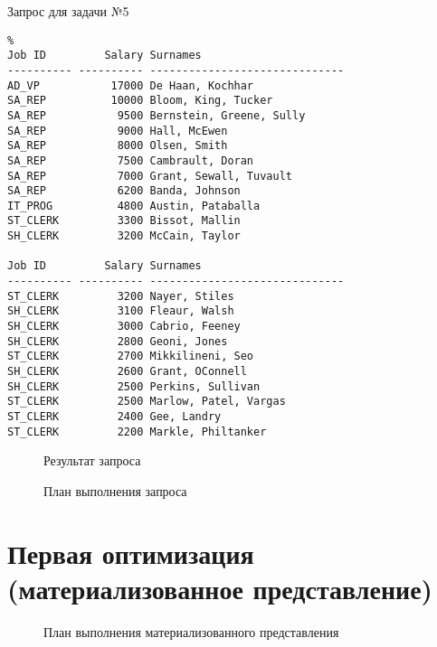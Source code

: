 
\begin{algorithm}[H]
  \caption{Запрос для задачи №5}
  \label{code-task-5}
\end{algorithm}

\begin{verbatim}%
Job ID         Salary Surnames
---------- ---------- ------------------------------
AD_VP           17000 De Haan, Kochhar
SA_REP          10000 Bloom, King, Tucker
SA_REP           9500 Bernstein, Greene, Sully
SA_REP           9000 Hall, McEwen
SA_REP           8000 Olsen, Smith
SA_REP           7500 Cambrault, Doran
SA_REP           7000 Grant, Sewall, Tuvault
SA_REP           6200 Banda, Johnson
IT_PROG          4800 Austin, Pataballa
ST_CLERK         3300 Bissot, Mallin
SH_CLERK         3200 McCain, Taylor

Job ID         Salary Surnames
---------- ---------- ------------------------------
ST_CLERK         3200 Nayer, Stiles
SH_CLERK         3100 Fleaur, Walsh
SH_CLERK         3000 Cabrio, Feeney
SH_CLERK         2800 Geoni, Jones
ST_CLERK         2700 Mikkilineni, Seo
SH_CLERK         2600 Grant, OConnell
SH_CLERK         2500 Perkins, Sullivan
ST_CLERK         2500 Marlow, Patel, Vargas
ST_CLERK         2400 Gee, Landry
ST_CLERK         2200 Markle, Philtanker
\end{verbatim}
\begin{figure}[H]%
  \caption{Результат запроса}
  \label{fig-task-5-output}
\end{figure}


\begin{figure}[H]%
  \caption{План выполнения запроса}
  \label{fig-task-5-plan}
\end{figure}


\section{Первая оптимизация (материализованное представление)}


\begin{figure}[H]%
  \caption{План выполнения материализованного представления}
  \label{fig-task-5-mview-plan}
\end{figure}




